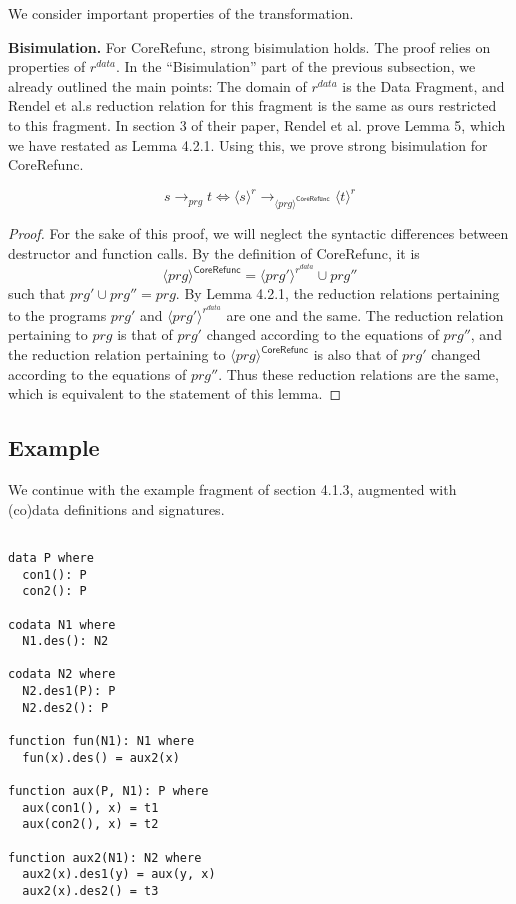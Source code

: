 We consider important properties of the transformation.

\textbf{Bisimulation.} For \textsf{CoreRefunc}, strong bisimulation holds. The proof relies on properties of $r^{data}$. In the ``Bisimulation'' part of the previous subsection, we already outlined the main points: The domain of $r^{data}$ is the Data Fragment, and Rendel et al.s reduction relation for this fragment is the same as ours restricted to this fragment. In section 3 of their paper, Rendel et al. prove Lemma 5, which we have restated as Lemma 4.2.1. Using this, we prove strong bisimulation for \textsf{CoreRefunc}.

\begin{lemma}
\[
s \longrightarrow_{prg} t \iff \langle s \rangle^r \longrightarrow_{\langle prg \rangle^{\textsf{CoreRefunc}}} \langle t \rangle^r
\]

\begin{proof}
For the sake of this proof, we will neglect the syntactic differences between destructor and function calls. By the definition of \textsf{CoreRefunc}, it is
\[
\langle prg \rangle^{\textsf{CoreRefunc}} = \langle prg' \rangle^{r^{data}} \cup prg''
\]
such that $prg' \cup prg'' = prg$. By Lemma 4.2.1, the reduction relations pertaining to the programs $prg'$ and $\langle prg' \rangle^{r^{data}}$ are one and the same. The reduction relation pertaining to $prg$ is that of $prg'$ changed according to the equations of $prg''$, and the reduction relation pertaining to $\langle prg \rangle^{\textsf{CoreRefunc}}$ is also that of $prg'$ changed according to the equations of $prg''$. Thus these reduction relations are the same, which is equivalent to the statement of this lemma.
\end{proof}
\end{lemma}

\subsection{Example}

We continue with the example fragment of section 4.1.3, augmented with (co)data definitions and signatures.

\begin{lstlisting}

data P where
  con1(): P
  con2(): P

codata N1 where
  N1.des(): N2

codata N2 where
  N2.des1(P): P
  N2.des2(): P

function fun(N1): N1 where
  fun(x).des() = aux2(x)

function aux(P, N1): P where
  aux(con1(), x) = t1
  aux(con2(), x) = t2

function aux2(N1): N2 where
  aux2(x).des1(y) = aux(y, x)
  aux2(x).des2() = t3

\end{lstlisting}

